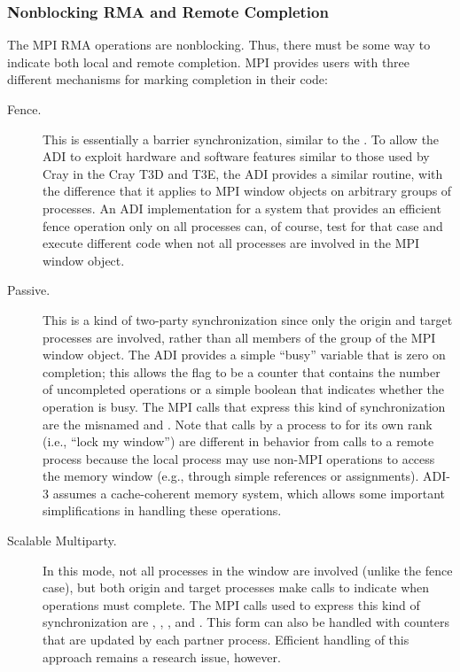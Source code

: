 \subsubsection{Nonblocking RMA and Remote Completion}
The MPI RMA operations are nonblocking.  Thus, there must be some way
to indicate both local and remote completion.  MPI provides users
with three different mechanisms for marking completion in their code:
\begin{description}
\item[Fence.]This is essentially a barrier synchronization, similar to
the .  To allow the ADI to exploit hardware and
software features similar to those used by Cray  in the
Cray T3D and T3E, the ADI provides a similar routine, with the
difference that it applies to MPI window objects on arbitrary groups
of processes. An ADI implementation for a system that
provides an efficient fence operation only on all processes can, of
course, test for that case and execute different code when not all
processes are involved in the MPI window object.

\item[Passive.]This is a kind of two-party synchronization since only
the origin and target processes are involved, rather than all members of the
group of the MPI window object.  The ADI provides a
simple ``busy'' variable that is zero on completion; this allows the
flag to be a counter that contains the number of uncompleted
operations or a simple boolean that indicates whether the operation is
busy.  The MPI calls that express this kind of synchronization are the
misnamed 
 and .  Note that calls by a
process to  for its own rank (i.e., ``lock my
window'') are different in behavior from calls to a remote process
because the local process may use non-MPI operations to access the
memory window (e.g., through simple references or assignments).  ADI-3
assumes a cache-coherent memory system, which allows some important
simplifications in handling these operations.

\item[Scalable Multiparty.]In this mode, not all processes in the
window are involved (unlike the fence case), but both origin and
target processes make calls to indicate when operations must complete.
The MPI calls used to express this kind of synchronization are
, , ,
and .
This form can also be handled with counters that are updated by each
partner process.  Efficient handling of this approach remains a
research issue, however.
\end{description}

